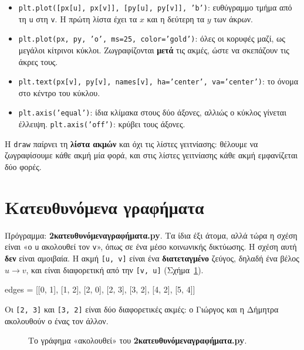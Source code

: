\documentclass[11pt,a4paper]{article}
\newcommand{\code}[1]{\texttt{#1}}
\newcommand{\prog}[1]{\textsf{\bfseries #1}}
\renewcommand{\_}{\textunderscore\allowbreak}
\begin{document}
\begin{itemize}
  \item \code{plt.plot([px[u], px[v]], [py[u], py[v]], 'b')}: ευθύγραμμο τμήμα από τη \code{u} στη
        \code{v}. Η πρώτη λίστα έχει τα $x$ και η δεύτερη τα $y$ των άκρων.
  \item \code{plt.plot(px, py, 'o', ms=25, color='gold')}: όλες οι κορυφές μαζί, ως μεγάλοι κίτρινοι
        κύκλοι. Ζωγραφίζονται \textbf{μετά} τις ακμές, ώστε να σκεπάζουν τις άκρες τους.
  \item \code{plt.text(px[v], py[v], names[v], ha='center', va='center')}: το όνομα στο κέντρο του
        κύκλου.
  \item \code{plt.axis('equal')}: ίδια κλίμακα στους δύο άξονες, αλλιώς ο κύκλος γίνεται έλλειψη.
        \code{plt.axis('off')}: κρύβει τους άξονες.
\end{itemize}

Η \code{draw} παίρνει τη \textbf{λίστα ακμών} και όχι τις λίστες γειτνίασης: θέλουμε να
ζωγραφίσουμε κάθε ακμή μία φορά, και στις λίστες γειτνίασης κάθε ακμή εμφανίζεται δύο φορές.

\section{Κατευθυνόμενα γραφήματα}
\noindent Πρόγραμμα: \prog{2\_κατευθυνόμενα\_γραφήματα.py}. Τα ίδια έξι άτομα, αλλά τώρα η σχέση
είναι «ο \code{u} ακολουθεί τον \code{v}», όπως σε ένα μέσο κοινωνικής δικτύωσης. Η σχέση αυτή
\textbf{δεν} είναι αμοιβαία. Η ακμή \code{[u, v]} είναι ένα \textbf{διατεταγμένο} ζεύγος, δηλαδή ένα
βέλος $u \to v$, και είναι διαφορετική από την \code{[v, u]} (Σχήμα~\ref{fig:directed}).

\begin{Piton}
edges = [[0, 1], [1, 2], [2, 0], [2, 3], [3, 2], [4, 2], [5, 4]]
\end{Piton}

Οι \code{[2, 3]} και \code{[3, 2]} είναι δύο διαφορετικές ακμές: ο Γιώργος και η Δήμητρα ακολουθούν ο
ένας τον άλλον.

\begin{figure}[h]
  \centering
  \caption{Το γράφημα «ακολουθεί» του \prog{2\_κατευθυνόμενα\_γραφήματα.py}.}
  \label{fig:directed}
\end{figure}
\end{document}
